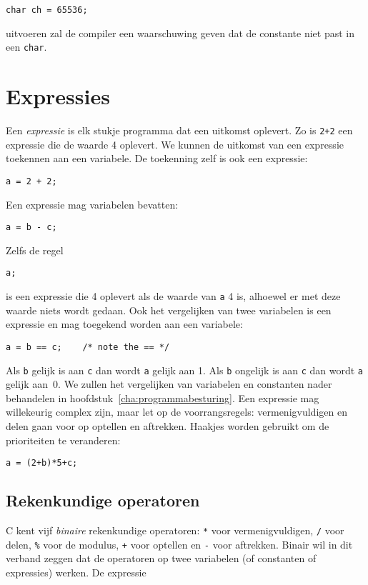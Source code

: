 \hspace*{1em}\texttt{char ch = 65536;}

uitvoeren zal de compiler een waarschuwing geven dat de constante niet past in een \texttt{char}.


\section{Expressies}
Een \textsl{expressie} is elk stukje programma dat een uitkomst oplevert. Zo is \texttt{2+2} een expressie die de waarde 4 oplevert. We kunnen de uitkomst van een expressie toekennen aan een variabele. De toekenning zelf is ook een expressie:

\hspace*{1em}\texttt{a = 2 + 2;}

Een expressie mag variabelen bevatten:

\hspace*{1em}\texttt{a = b - c;}

Zelfs de regel

\hspace*{1em}\texttt{a;}

is een expressie die 4 oplevert als de waarde van \texttt{a} 4 is, alhoewel er met deze waarde niets wordt gedaan. Ook het vergelijken van twee variabelen is een expressie en mag toegekend worden aan een variabele:

\hspace*{1em}\texttt{a = b == c; \ \ \  /* note the == */}

Als \texttt{b} gelijk is aan \texttt{c} dan wordt \texttt{a} gelijk aan 1. Als \texttt{b} ongelijk is aan \texttt{c} dan wordt \texttt{a} gelijk aan~0. We zullen het vergelijken van variabelen en constanten nader behandelen in hoofdstuk~\ref{cha:programmabesturing}.
%
Een expressie mag willekeurig complex zijn, maar let op de voorrangsregels: vermenigvuldigen en delen gaan voor op optellen en aftrekken. Haakjes worden gebruikt om de prioriteiten te veranderen:

\hspace*{1em}\texttt{a = (2+b)*5+c;}

\subsection{Rekenkundige operatoren}
C kent vijf \textsl{binaire} rekenkundige operatoren: \texttt{*} voor vermenigvuldigen, \texttt{/} voor delen, \texttt{\%} voor de modulus, \texttt{+} voor optellen en \texttt{-} voor aftrekken. Binair wil in dit verband zeggen dat de operatoren op twee variabelen (of constanten of expressies) werken. 
De expressie

